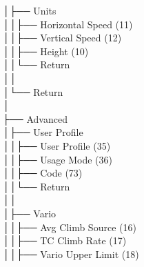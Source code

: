 │\hspace{2em}├── Units \\
│\hspace{2em}│\hspace{2em}├── Horizontal Speed (11) \\
│\hspace{2em}│\hspace{2em}├── Vertical Speed (12) \\
│\hspace{2em}│\hspace{2em}├── Height (10) \\
│\hspace{2em}│\hspace{2em}└── Return \\
│\hspace{2em}│\hspace{2em} \\
│\hspace{2em}└── Return \\
│\hspace{2em} \\
├── Advanced \\
│\hspace{2em}├── User Profile \\
│\hspace{2em}│\hspace{2em}├── User Profile (35) \\
│\hspace{2em}│\hspace{2em}├── Usage Mode (36) \\
│\hspace{2em}│\hspace{2em}├── Code (73) \\
│\hspace{2em}│\hspace{2em}└── Return \\
│\hspace{2em}│\hspace{2em} \\
│\hspace{2em}├── Vario \\
│\hspace{2em}│\hspace{2em}├── Avg Climb Source (16) \\
│\hspace{2em}│\hspace{2em}├── TC Climb Rate (17) \\
│\hspace{2em}│\hspace{2em}├── Vario Upper Limit (18) \\
